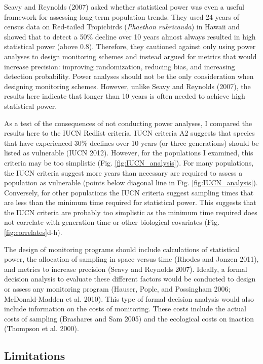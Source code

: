 \documentclass[12pt,]{article}
\begin{document}
Seavy and Reynolds (2007) asked whether statistical power was even a
useful framework for assessing long-term population trends. They used 24
years of census data on Red-tailed Tropicbirds
(\emph{Phaethon rubricauda}) in Hawaii and showed that to detect a 50\%
decline over 10 years almost always resulted in high statistical power
(above 0.8). Therefore, they cautioned against only using power analyses
to design monitoring schemes and instead argued for metrics that would
increase precision: improving randomization, reducing bias, and
increasing detection probability. Power analyses should not be the only
consideration when designing monitoring schemes. However, unlike Seavy
and Reynolds (2007), the results here indicate that longer than 10 years
is often needed to achieve high statistical power.

As a test of the consequences of not conducting power analyses, I
compared the results here to the IUCN Redlist criteria. IUCN criteria A2
suggests that species that have experienced 30\% declines over 10 years
(or three generations) should be listed as vulnerable (IUCN 2012).
However, for the populations I examined, this criteria may be too
simplistic (Fig. \ref{fig:IUCN_analysis}). For many populations, the
IUCN criteria suggest more years than necessary are required to assess a
population as vulnerable (points below diagonal line in Fig.
\ref{fig:IUCN_analysis}). Conversely, for other populations the IUCN
criteria suggest sampling times that are less than the minimum time
required for statistical power. This suggests that the IUCN criteria are
probably too simplistic as the minimum time required does not correlate
with generation time or other biological covariates (Fig.
\ref{fig:correlates}d-h).

The design of monitoring programs should include calculations of
statistical power, the allocation of sampling in space versus time
(Rhodes and Jonzen 2011), and metrics to increase precision (Seavy and
Reynolds 2007). Ideally, a formal decision analysis to evaluate these
different factors would be conducted to design or assess any monitoring
program (Hauser, Pople, and Possingham 2006; McDonald-Madden et al.
2010). This type of formal decision analysis would also include
information on the costs of monitoring. These costs include the actual
costs of sampling (Brashares and Sam 2005) and the ecological costs on
inaction (Thompson et al. 2000).

\subsection{Limitations}\label{limitations}
\end{document}
